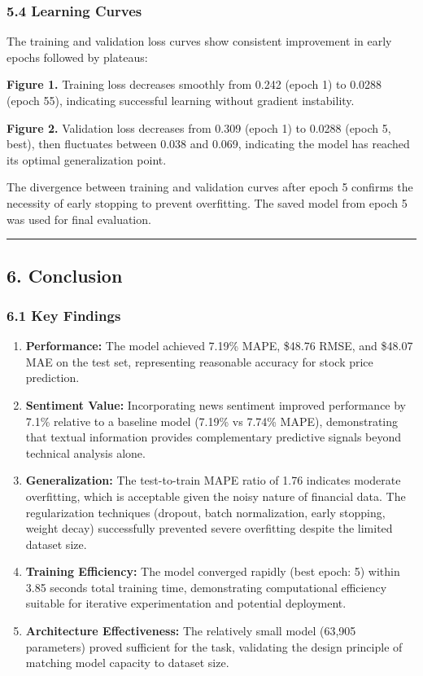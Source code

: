 \documentclass[
]{article}
\begin{document}
\subsubsection{5.4 Learning Curves}\label{54-learning-curves}

The training and validation loss curves show consistent improvement in
early epochs followed by plateaus:

\textbf{Figure 1.} Training loss decreases smoothly from 0.242 (epoch 1)
to 0.0288 (epoch 55), indicating successful learning without gradient
instability.

\textbf{Figure 2.} Validation loss decreases from 0.309 (epoch 1) to
0.0288 (epoch 5, best), then fluctuates between 0.038 and 0.069,
indicating the model has reached its optimal generalization point.

The divergence between training and validation curves after epoch 5
confirms the necessity of early stopping to prevent overfitting. The
saved model from epoch 5 was used for final evaluation.

\begin{center}\rule{0.5\linewidth}{0.5pt}\end{center}

\subsection{6. Conclusion}\label{6-conclusion}

\subsubsection{6.1 Key Findings}\label{61-key-findings}

\begin{enumerate}
\def\labelenumi{\arabic{enumi}.}
\item
  \textbf{Performance:} The model achieved 7.19\% MAPE, \$48.76 RMSE,
  and \$48.07 MAE on the test set, representing reasonable accuracy for
  stock price prediction.
\item
  \textbf{Sentiment Value:} Incorporating news sentiment improved
  performance by 7.1\% relative to a baseline model (7.19\% vs 7.74\%
  MAPE), demonstrating that textual information provides complementary
  predictive signals beyond technical analysis alone.
\item
  \textbf{Generalization:} The test-to-train MAPE ratio of 1.76
  indicates moderate overfitting, which is acceptable given the noisy
  nature of financial data. The regularization techniques (dropout,
  batch normalization, early stopping, weight decay) successfully
  prevented severe overfitting despite the limited dataset size.
\item
  \textbf{Training Efficiency:} The model converged rapidly (best epoch:
  5) within 3.85 seconds total training time, demonstrating
  computational efficiency suitable for iterative experimentation and
  potential deployment.
\item
  \textbf{Architecture Effectiveness:} The relatively small model
  (63,905 parameters) proved sufficient for the task, validating the
  design principle of matching model capacity to dataset size.
\end{enumerate}
\end{document}
